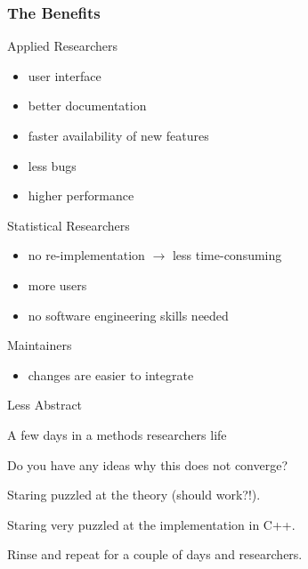 \documentclass{beamer}
\newenvironment{wideitemize}{
    \itemize\addtolength{\itemsep}{15pt}\addtolength{\topsep}{10pt}}{\enditemize}
\begin{document}
    \begin{frame}
        \frametitle{The Benefits}
        \vspace{0.5cm}
        \begin{wideitemize}
            \item Applied Researchers
            \begin{itemize}
                \item user interface
                \item better documentation
                \item faster availability of new features
                \item less bugs
                \item higher performance
            \end{itemize}
            \item Statistical Researchers
            \begin{itemize}
                \item no re-implementation $\to$ less time-consuming
                \item more users
                \item no software engineering skills needed
            \end{itemize}
            \item Maintainers
            \begin{itemize}
                \item changes are easier to integrate
            \end{itemize}
        \end{wideitemize}
    \end{frame}
    

    \begin{frame}[c]
    \centering \Huge Less Abstract
    \end{frame}

    \begin{frame}{A few days in a methods researchers life}
        \begin{wideitemize}
        \item Do you have any ideas why this does not converge?
        \item Staring puzzled at the theory (should work?!).
        \item Staring very puzzled at the implementation in C++.
        \item Rinse and repeat for a couple of days and researchers.
        \end{wideitemize}
    \end{frame}
\end{document}
